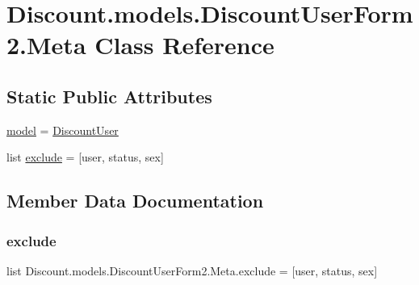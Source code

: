 \hypertarget{class_discount_1_1models_1_1_discount_user_form2_1_1_meta}{}\section{Discount.\+models.\+Discount\+User\+Form2.\+Meta Class Reference}
\label{class_discount_1_1models_1_1_discount_user_form2_1_1_meta}
\subsection*{Static Public Attributes}
\begin{DoxyCompactItemize}
\item 
\hyperlink{class_discount_1_1models_1_1_discount_user_form2_1_1_meta_afd9d229cc546924bd1276d55221335ce}{model} = \hyperlink{class_discount_1_1models_1_1_discount_user}{Discount\+User}
\item 
list \hyperlink{class_discount_1_1models_1_1_discount_user_form2_1_1_meta_a79b8bcae9bd31a5b7e07a62707c37b68}{exclude} = \mbox{[}\textquotesingle{}user\textquotesingle{}, \textquotesingle{}status\textquotesingle{}, \textquotesingle{}sex\textquotesingle{}\mbox{]}
\end{DoxyCompactItemize}


\subsection{Member Data Documentation}
\mbox{\label{class_discount_1_1models_1_1_discount_user_form2_1_1_meta_a79b8bcae9bd31a5b7e07a62707c37b68}} 
\subsubsection{\texorpdfstring{exclude}{exclude}}
{\footnotesize\ttfamily list Discount.\+models.\+Discount\+User\+Form2.\+Meta.\+exclude = \mbox{[}\textquotesingle{}user\textquotesingle{}, \textquotesingle{}status\textquotesingle{}, \textquotesingle{}sex\textquotesingle{}\mbox{]}\hspace{0.3cm}{\ttfamily [static]}}

